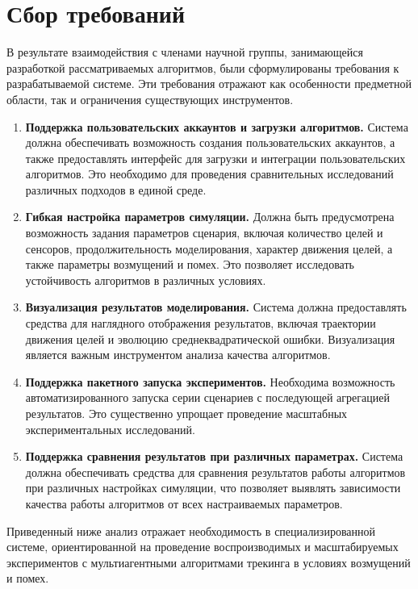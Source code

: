 
\section{Сбор требований}

В результате взаимодействия с членами научной группы, занимающейся
разработкой рассматриваемых алгоритмов, были сформулированы требования
к разрабатываемой системе. Эти требования отражают как особенности
предметной области, так и ограничения существующих инструментов.

\begin{enumerate}
    \item \textbf{Поддержка пользовательских аккаунтов и загрузки алгоритмов.}  
    Система должна обеспечивать возможность создания пользовательских
    аккаунтов, а также предоставлять интерфейс для загрузки и интеграции
    пользовательских алгоритмов. Это необходимо для проведения
    сравнительных исследований различных подходов в единой среде.
    
    \item \textbf{Гибкая настройка параметров симуляции.}  
    Должна быть предусмотрена возможность задания параметров сценария,
    включая количество целей и сенсоров, продолжительность моделирования,
    характер движения целей, а также параметры возмущений и помех.
    Это позволяет исследовать устойчивость алгоритмов в различных условиях.
    
    \item \textbf{Визуализация результатов моделирования.}  
    Система должна предоставлять средства для наглядного отображения
    результатов, включая траектории движения целей и эволюцию
    среднеквадратической ошибки. Визуализация является важным инструментом
    анализа качества алгоритмов.
    
    \item \textbf{Поддержка пакетного запуска экспериментов.}  
    Необходима возможность автоматизированного запуска серии сценариев
    с последующей агрегацией результатов. Это существенно упрощает
    проведение масштабных экспериментальных исследований.
    
    \item \textbf{Поддержка сравнения результатов при различных параметрах.}  
    Система должна обеспечивать средства для сравнения результатов работы
    алгоритмов при различных настройках симуляции, что позволяет выявлять
    зависимости качества работы алгоритмов от всех настраиваемых параметров.
\end{enumerate}

\vspace{0.5em}

Приведенный ниже анализ отражает необходимость в специализированной
системе, ориентированной на проведение воспроизводимых и масштабируемых
экспериментов с мультиагентными алгоритмами трекинга в условиях
возмущений и помех.